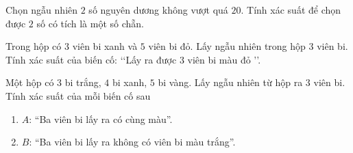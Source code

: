 \begin{bt}%
	Chọn ngẫu nhiên $ 2 $ số  nguyên dương không vượt quá $ 20 $. Tính xác suất để chọn được $ 2 $ số có tích là một số chẵn.
\end{bt}

\begin{bt}%
	Trong hộp có  $ 3 $ viên bi xanh và $ 5 $ viên bi đỏ. Lấy ngẫu nhiên trong hộp $ 3 $ viên bi. Tính xác suất của biến cố: \lq\lq Lấy ra được $ 3 $ viên bi màu đỏ \rq\rq.
\end{bt}

\begin{bt}%
	Một hộp có $ 3 $ bi trắng, $ 4 $ bi xanh, $ 5 $ bi vàng. Lấy ngẫu nhiên từ hộp ra $ 3 $ viên bi. Tính xác suất  của mỗi biến cố sau
	\begin{enumerate}
		\item $ A $: “Ba viên bi  lấy ra có cùng màu”.
		\item $ B $: “Ba viên bi lấy ra không có viên bi màu trắng”. 
	\end{enumerate}
\end{bt}

